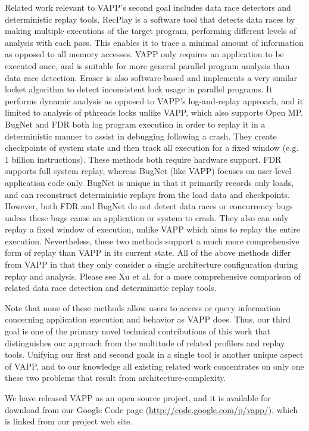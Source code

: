 Related work relevant to VAPP's second goal includes
data race detectors and deterministic replay tools. 
RecPlay \cite{ronsse2000non} is a software tool
that detects data races by making multiple executions of
the target program, performing different levels of
analysis with each pass.  This enables it to trace
a minimal amount of information as opposed to all memory
accesses.  VAPP only requires an application to be
executed once, and is suitable for more general
parallel program analysis than data race detection.
Eraser \cite{savage1997eraser} is also software-based
and implements a very similar locket algorithm to
detect inconsistent lock usage in parallel programs.
It performs dynamic analysis as opposed to VAPP's
log-and-replay approach, and it limited to analysis
of pthreads locks unlike VAPP, which also supports
Open MP.  BugNet \cite{narayansamy2005bugnet} and FDR
\cite{xu2003fdr} both log program execution in order
to replay it in a deterministic manner to assist
in debugging following a crash.  They create checkpoints
of system state and then track all execution for a fixed
window (e.g. 1 billion instructions).  These methods
both require hardware support.  FDR supports full system
replay, whereas BugNet (like VAPP) focuses on user-level
application code only.  BugNet is unique in that it
primarily records only loads, and can reconstruct
deterministic replays from the load data and checkpoints.
However, both FDR and BugNet do not detect data races
or concurrency bugs unless these bugs cause an application
or system to crash.  They also can only replay a fixed
window of execution, unlike VAPP which aims to
replay the entire execution.  Nevertheless, these
two methods support a much more comprehensive form of replay
than VAPP in its current state.
All of the above methods differ from VAPP in that they
only consider a single architecture configuration during
replay and analysis.  Please see Xu et al. \cite{xu2003fdr} for a more
comprehensive comparison of related data race detection
and deterministic replay tools.

Note that none of these methods allow users to access or
query information concerning application execution and behavior
as VAPP does.  Thus, our third goal is one of the primary novel
technical contributions of this
work that distinguishes our approach from the multitude of
related profilers and replay tools.  Unifying our first and
second goals in a single tool is another unique aspect of VAPP,
and to our knowledge all existing related work concentrates on 
only one these two problems that result from architecture-complexity.

We have released VAPP as an open source project, and it is available
for download from our Google Code page (\url{http://code.google.com/p/vapp/}),
which is linked from our project web site.